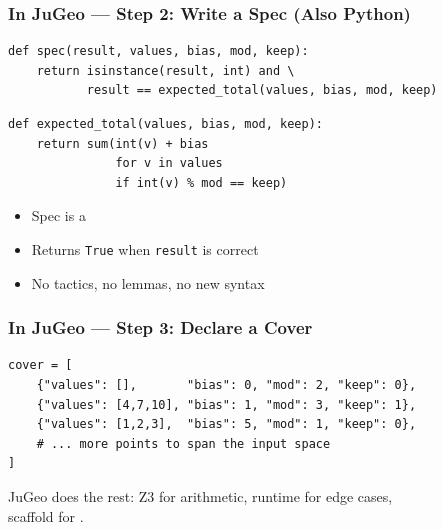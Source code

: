 \begin{frame}[fragile]
\frametitle{In JuGeo --- Step 2: Write a Spec (Also Python)}
\begin{lstlisting}
def spec(result, values, bias, mod, keep):
    return isinstance(result, int) and \
           result == expected_total(values, bias, mod, keep)
\end{lstlisting}
\vfill
\begin{lstlisting}
def expected_total(values, bias, mod, keep):
    return sum(int(v) + bias
               for v in values
               if int(v) % mod == keep)
\end{lstlisting}
\vfill
\begin{itemize}
  \item Spec is a 
  \item Returns \texttt{True} when \texttt{result} is correct
  \item No tactics, no lemmas, no new syntax
\end{itemize}
\end{frame}

\begin{frame}[fragile]
\frametitle{In JuGeo --- Step 3: Declare a Cover}
\begin{lstlisting}
cover = [
    {"values": [],       "bias": 0, "mod": 2, "keep": 0},
    {"values": [4,7,10], "bias": 1, "mod": 3, "keep": 1},
    {"values": [1,2,3],  "bias": 5, "mod": 1, "keep": 0},
    # ... more points to span the input space
]
\end{lstlisting}
\vfill
\begin{center}
\end{center}
\medskip
\centering JuGeo does the rest: Z3 for arithmetic, runtime for edge cases,\\
scaffold for \jugmark{provenance}.
\end{frame}

